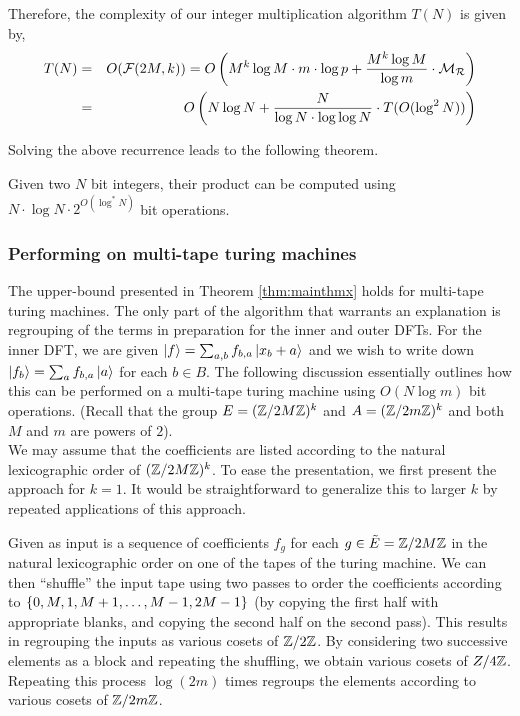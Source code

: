 \documentclass[11pt]{article}
\begin{document}
Therefore, the complexity of our integer multiplication algorithm
$T(N)$ is given by,
\begin{eqnarray*}
T(N) & = & O(\mathcal{F}(2M, k)) = O\left(M^k\log M\cdot m\cdot \log p + \frac{M^k\log
  M}{\log m} \cdot \mathcal{M}_{\mathcal{R}}\right)\\
& = & O\left(N\log N + \frac{N}{\log N\cdot \log\log N} \cdot T(O(\log^2N))\right)
\end{eqnarray*}

\noindent Solving the above recurrence leads to the following theorem.

\begin{theorem} \label{thm:mainthmx}
Given two $N$ bit integers, their product can be computed using
$N\cdot \log N\cdot 2^{O(\log^*N)}$ bit operations.
\end{theorem}

\subsubsection*{Performing on multi-tape turing machines}

The upper-bound presented in Theorem \ref{thm:mainthmx} holds for
multi-tape turing machines. The only part of the algorithm that
warrants an explanation is regrouping of the terms in preparation for
the inner and outer DFTs. For the inner DFT, we are given $\left| f \right\rangle =
\sum_{a,b} f_{b,a}\left| x_b + a \right\rangle$ and we wish to write down $\left| f_b \right\rangle
= \sum_{a} f_{b,a}\left| a \right\rangle$ for each $b\in B$. The following discussion
essentially outlines how this can be performed on a multi-tape turing
machine using $O(N\log m)$ bit operations. (Recall that the group $E =
(\mathbb{Z}/2M\mathbb{Z})^k$ and $A = (\mathbb{Z}/2m\mathbb{Z})^k$ and both $M$ and $m$ are powers of
$2$). \\

We may assume that the coefficients are listed according to the
natural lexicographic order of $(\mathbb{Z}/2M\mathbb{Z})^k$. To ease the
presentation, we first present the approach for $k=1$. It would be
straightforward to generalize this to larger $k$ by repeated
applications of this approach.


Given as input is a sequence of coefficients $f_g$ for each $g\in
\tilde{E} = \mathbb{Z}/2M\mathbb{Z}$ in the natural lexicographic order on one of the
tapes of the turing machine. We can then ``shuffle'' the input tape
using two passes to order the coefficients according to
$\left\{0,M,1,M+1,\dots, M-1,2M-1\right\}$ (by copying the first half with
appropriate blanks, and copying the second half on the second
pass). This results in regrouping the inputs as various cosets of
$\mathbb{Z}/2\mathbb{Z}$. By considering two successive elements as a block and
repeating the shuffling, we obtain various cosets of
$Z/4\mathbb{Z}$. Repeating this process $\log(2m)$ times regroups the elements
according to various cosets of $\mathbb{Z}/2m\mathbb{Z}$.\\
\end{document}
